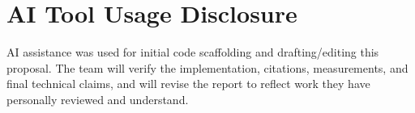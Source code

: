 \documentclass[11pt]{article}
\begin{document}
\section*{AI Tool Usage Disclosure}
AI assistance was used for initial code scaffolding and drafting/editing this
proposal. The team will verify the implementation, citations, measurements, and
final technical claims, and will revise the report to reflect work they have
personally reviewed and understand.



\end{document}
